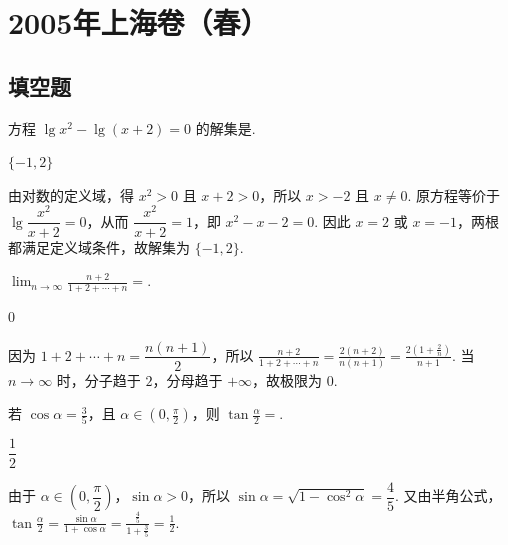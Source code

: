 \chapter{2005年上海卷（春）}
\section{填空题}
\begin{problem}
方程 \( \lg x^{2}-\lg(x+2)=0 \) 的解集是\fillinblank{}.
\end{problem}

\begin{answer}
\(\{-1,2\}\)
\end{answer}

\begin{solution}
由对数的定义域，得 \(x^{2}>0\) 且 \(x+2>0\)，所以 \(x>-2\) 且 \(x\neq0\). 原方程等价于 \(\lg\dfrac{x^{2}}{x+2}=0\)，从而 \(\dfrac{x^{2}}{x+2}=1\)，即 \(x^{2}-x-2=0\). 因此 \(x=2\) 或 \(x=-1\)，两根都满足定义域条件，故解集为 \(\{-1,2\}\).
\end{solution}

\begin{problem}
\(\displaystyle\lim_{n\to \infty}\frac{n + 2}{1 + 2 + \cdots + n} =\)\fillinblank{}.
\end{problem}

\begin{answer}
0
\end{answer}

\begin{solution}
因为 \(1+2+\cdots+n=\dfrac{n(n+1)}{2}\)，所以
\(\displaystyle\frac{n+2}{1+2+\cdots+n}=\frac{2(n+2)}{n(n+1)}=\frac{2(1+\frac{2}{n})}{n+1}\).
当 \(n\to\infty\) 时，分子趋于 \(2\)，分母趋于 \(+\infty\)，故极限为 \(0\).
\end{solution}

\begin{problem}
若 \(\cos \alpha = \frac{3}{5}\)，且 \(\alpha \in \left(0, \frac{\pi}{2}\right)\)，则 \(\tan \frac{\alpha}{2} =\)\fillinblank{}.
\end{problem}

\begin{answer}
\(\dfrac{1}{2}\)
\end{answer}

\begin{solution}
由于 \(\alpha\in\left(0,\dfrac{\pi}{2}\right)\)，\(\sin\alpha>0\)，所以
\(\sin\alpha=\sqrt{1-\cos^{2}\alpha}=\dfrac45\). 又由半角公式，
\(\displaystyle\tan\frac\alpha2=\frac{\sin\alpha}{1+\cos\alpha}=\frac{\frac{4}{5}}{1+\frac{3}{5}}=\frac12\).
\end{solution}

